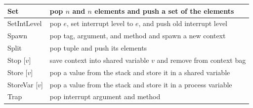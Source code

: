 \documentclass{report}
\begin{document}
{\begin{tabular}{|l|l|}
\hline
Set & pop $n$ and $n$ elements and push a set of the elements \\
\hline
SetIntLevel & pop $e$, set interrupt level to $e$, and push old interrupt level \\
\hline
Spawn & pop tag, argument, and method and spawn a new context \\
\hline
Split & pop tuple and push its elements \\
\hline
Stop [$v$] & save context into shared variable $v$ and remove from context bag \\
\hline
Store [$v$] & pop a value from the stack and store it in a shared variable \\
\hline
StoreVar [$v$] & pop a value from the stack and store it in a process variable \\
\hline
Trap & pop interrupt argument and method \\
\hline
\end{tabular}
}
\end{document}
